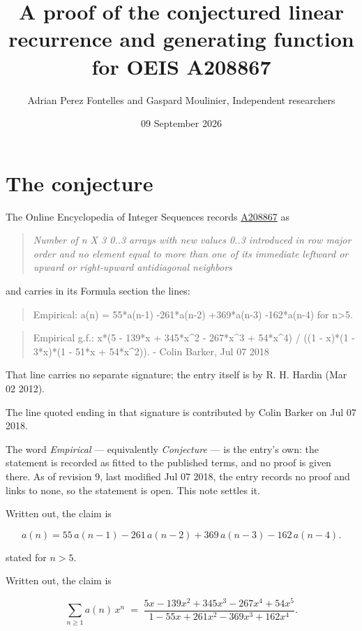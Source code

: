 \documentclass[11pt]{article}
\title{A proof of the conjectured linear recurrence and generating function for OEIS A208867}
\author{Adrian Perez Fontelles and Gaspard Moulinier, Independent researchers}
\date{09 September 2026}
\theoremstyle{definition}
\begin{document}
\maketitle
\section{The conjecture}

The Online Encyclopedia of Integer Sequences records \href{https://oeis.org/A208867}{A208867} as

\begin{quote}\itshape Number of n X 3 0..3 arrays with new values 0..3 introduced in row major order and no element equal to more than one of its immediate leftward or upward or right-upward antidiagonal neighbors\end{quote}

and carries in its Formula section the lines:

\begin{quote}\ttfamily Empirical: a(n) = 55*a(n-1) -261*a(n-2) +369*a(n-3) -162*a(n-4) for n>5.\end{quote}

\begin{quote}\ttfamily Empirical g.f.: x*(5 - 139*x + 345*x\textasciicircum{}2 - 267*x\textasciicircum{}3 + 54*x\textasciicircum{}4) / ((1 - x)*(1 - 3*x)*(1 - 51*x + 54*x\textasciicircum{}2)). - Colin Barker, Jul 07 2018\end{quote}

That line carries no separate signature; the entry itself is by R. H. Hardin (Mar 02 2012).

The line quoted ending in that signature is contributed by Colin Barker on Jul 07 2018.

The word {\itshape Empirical} --- equivalently {\itshape Conjecture} --- is the entry's own: the statement is recorded as fitted to the published terms, and no proof is given there. As of revision 9, last modified Jul 07 2018, the entry records no proof and links to none, so the statement is open. This note settles it.

Written out, the claim is

\[a(n) = 55\,a(n-1) - 261\,a(n-2) + 369\,a(n-3) - 162\,a(n-4).\]

stated for $n > 5$.

Written out, the claim is

\[\sum_{n \ge 1} a(n)\,x^n \;=\; \frac{5x - 139x^{2} + 345x^{3} - 267x^{4} + 54x^{5}}{1 - 55x + 261x^{2} - 369x^{3} + 162x^{4}}.\]
\end{document}
